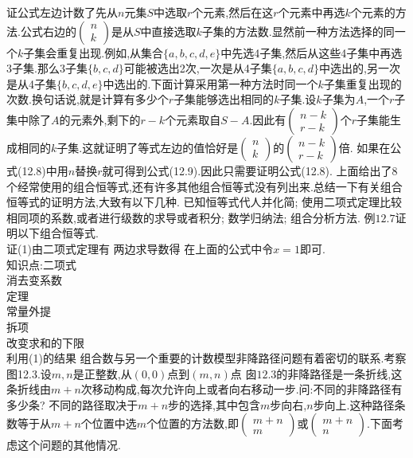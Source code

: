 证公式左边计数了先从$n$元集$S$中选取$r$个元素,然后在这$r$个元素中再选$k$个元素的方法.公式右边的$\left(\begin{array}{l}n\\k\end{array}\right)$是从$S$中直接选取$k$子集的方法数.显然前一种方法选择的同一个$k$子集会重复出现.例如,从集合$\{a,b,c,d,e\}$中先选4子集,然后从这些4子集中再选3子集.那么3子集$\{b,c,d\}$可能被选出2次,一次是从4子集$\{a,b,c,d\}$中选出的,另一次是从4子集$\{b,c,d,e\}$中选出的.下面计算采用第一种方法时同一个$k$子集重复出现的次数.换句话说,就是计算有多少个$r$子集能够选出相同的$k$子集.设$k$子集为$A$,一个$r$子集中除了$A$的元素外,剩下的$r-k$个元素取自$S-A$.因此有$\left(\begin{array}{l}n-k\\r-k\end{array}\right)$个$r$子集能生成相同的$k$子集.这就证明了等式左边的值恰好是$\left(\begin{array}{l}n\\k\end{array}\right)$的$\left(\begin{array}{c}n-k\\r-k\end{array}\right)$倍.
如果在公式(12.8)中用$n$替换$r$就可得到公式(12.9).因此只需要证明公式(12.8).
上面给出了8个经常使用的组合恒等式,还有许多其他组合恒等式没有列出来.总结一下有关组合恒等式的证明方法,大致有以下几种.
已知恒等式代人并化简;
使用二项式定理比较相同项的系数,或者进行级数的求导或者积分;
数学归纳法;
组合分析方法.
例$12.7$证明以下组合恒等式.\\
证(1)由二项式定理有
两边求导数得
在上面的公式中令$x=1$即可.\\
知识点:二项式\\
消去变系数\\
定理\\
常量外提\\
拆项\\
改变求和的下限\\
利用(1)的结果
组合数与另一个重要的计数模型非降路径问题有着密切的联系.考察图12.3.设$m,n$是正整数,从$(0,0)$点到$(m,n)$点
囱$12.3$的非降路径是一条折线,这条折线由$m+n$次移动构成,每次允许向上或者向右移动一步.问:不同的非降路径有多少条?
不同的路径取决于$m+n$步的选择,其中包含$m$步向右,$n$步向上.这种路径条数等于从$m+n$个位置中选$m$个位置的方法数,即$\left(\begin{array}{c}m+n\\m\end{array}\right)$或$\left(\begin{array}{c}m+n\\n\end{array}\right)$.下面考虑这个问题的其他情况.

